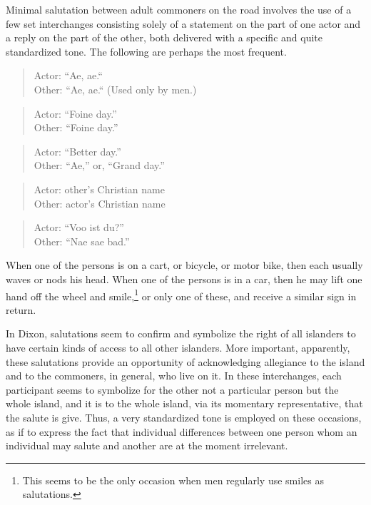 \documentclass[twoside,symmetric,nobib,justified]{tufte-book}
\begin{document}
Minimal salutation between adult commoners on the road involves the use
of a few set interchanges consisting solely of a statement on the part
of one actor and a reply on the part of the other, both delivered with a
specific and quite standardized tone. The following are perhaps the most
frequent.

\begin{quote}
Actor: ``Ae, ae.`` \\
Other: ``Ae, ae.`` (Used only by men.)
\end{quote}

\begin{quote}
Actor: ``Foine day.'' \\
Other: ``Foine day.''
\end{quote}

\begin{quote}
Actor: ``Better day.'' \\
Other: ``Ae,'' or, ``Grand day.''
\end{quote}

\begin{quote}
Actor: other's Christian name \\
Other: actor's Christian name
\end{quote}

\begin{quote}
Actor: ``Voo ist du?'' \\
Other: ``Nae sae bad.''
\end{quote}

\noindent When one of the persons is on a cart, or bicycle, or motor bike, then
each usually waves or nods his head. When one of the persons is in a
car, then he may lift one hand off the wheel and smile,\footnote{This
  seems to be the only occasion when men regularly use smiles as
  salutations.} or only one of these, and receive a similar sign in
return.

In Dixon, salutations seem to confirm and symbolize the right of all
islanders to have certain kinds of access to all other islanders. More
important, apparently, these salutations provide an opportunity of
acknowledging allegiance to the island and to the commoners, in general,
who live on it. In these interchanges, each participant seems to
symbolize for the other not a particular person but the whole island,
and it is to the whole island, via its momentary representative, that
the salute is give. Thus, a very standardized tone is employed on these
occasions, as if to express the fact that individual differences between
one person whom an individual may salute and another are at the moment
irrelevant.
\end{document}
